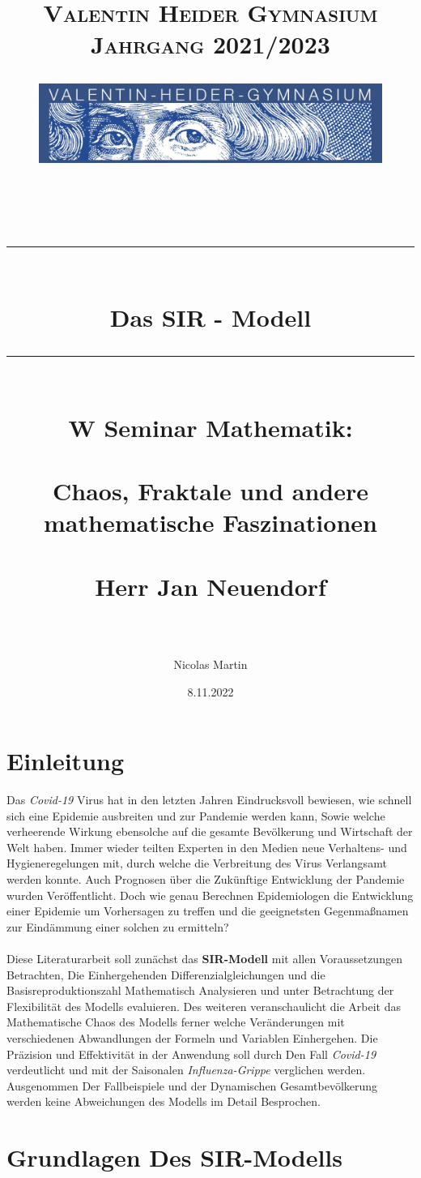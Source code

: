 \documentclass[12pt]{scrartcl} %
\title{	
	\normalfont\normalsize
	\vspace{200pt}
	\textsc{Valentin Heider Gymnasium}\\
	\vspace{10pt}
	\textsc{Jahrgang 2021/2023}\\
	\begin{figure}[h] %
	\centering
	\includegraphics[width=0.5\columnwidth]{VHGLogo.jpg} 
	\end{figure}
	\vspace{25pt}\\
	
	\rule{\linewidth}{0.5pt}\\
	\vspace{20pt}
	{\huge Das SIR - Modell}\\
	\vspace{12pt}
	\rule{\linewidth}{2pt}\\
	\vspace{20pt}
	{\Large W Seminar Mathematik:}\\
	\vspace{12pt}\\
	{\Large Chaos, Fraktale und andere mathematische Faszinationen}\\
	\vspace{20pt}\\
	{\Large Herr Jan Neuendorf}\\
	\vspace{15pt}\\
}
\author{\LARGE Nicolas Martin}
\date{\normalsize 8.11.2022}
\begin{document}
\maketitle %
\thispagestyle{empty}
\newpage

\doublespacing
\tableofcontents
\thispagestyle{empty}
\cleardoublepage
\onehalfspacing
\newpage

\section{Einleitung}


Das \textsl{Covid-19} Virus hat in den letzten Jahren Eindrucksvoll bewiesen, wie schnell sich eine Epidemie ausbreiten und zur Pandemie werden kann,  
Sowie welche verheerende Wirkung ebensolche auf die gesamte Bevölkerung und Wirtschaft der Welt haben. 
Immer wieder teilten Experten in den Medien neue Verhaltens- und Hygieneregelungen mit, durch welche die Verbreitung des Virus Verlangsamt werden konnte. Auch Prognosen über die Zukünftige Entwicklung der Pandemie wurden Veröffentlicht. 
Doch wie genau Berechnen Epidemiologen die Entwicklung einer Epidemie um Vorhersagen zu treffen und die geeignetsten Gegenmaßnamen zur Eindämmung einer solchen zu ermitteln?\\
\\
Diese Literaturarbeit soll zunächst das \textbf{SIR-Modell} mit allen Voraussetzungen Betrachten, Die Einhergehenden Differenzialgleichungen und die Basisreproduktionszahl Mathematisch Analysieren und unter Betrachtung der Flexibilität des Modells evaluieren. 
Des weiteren veranschaulicht die Arbeit das Mathematische Chaos des Modells 
ferner welche Veränderungen mit verschiedenen Abwandlungen der Formeln und Variablen Einhergehen. 
Die Präzision und Effektivität in der Anwendung soll durch Den Fall \textsl{Covid-19} verdeutlicht und mit der Saisonalen \textsl{Influenza-Grippe} verglichen werden. 
Ausgenommen Der Fallbeispiele und der Dynamischen Gesamtbevölkerung werden keine Abweichungen des Modells im Detail Besprochen. 


\newpage
\section{Grundlagen Des SIR-Modells}
\end{document}
